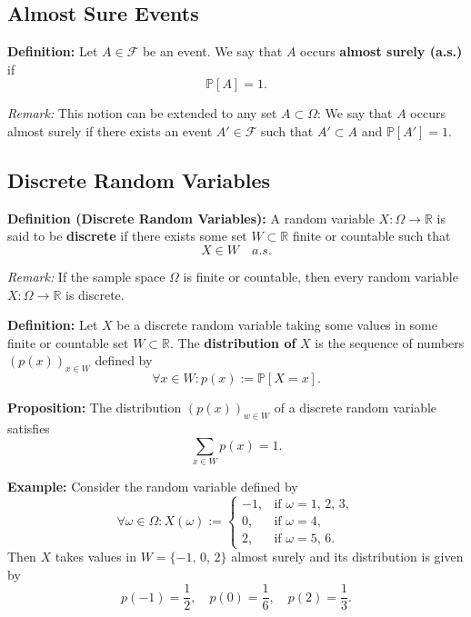 \documentclass[a4paper]{extarticle}
\begin{document}
\subsection{Almost Sure Events}

\textbf{Definition:} Let \(A \in \mathcal{F}\) be an event. We say that \(A\) occurs \textbf{almost surely (a.s.)} if
\[
    \mathbb{P}[A] = 1.
\]

\textit{Remark:} This notion can be extended to any set \(A \subset \Omega\): We say that \(A\) occurs almost surely if there exists an event \(A' \in \mathcal{F}\) such that \(A' \subset A\) and \(\mathbb{P}[A'] = 1\).

\subsection{Discrete Random Variables}

\textbf{Definition (Discrete Random Variables):} A random variable \(X : \Omega \to \mathbb{R}\) is said to be \textbf{discrete} if there exists some set \(W \subset \mathbb{R}\) finite or countable such that
\[
    X \in W \quad a.s.
\]

\textit{Remark:} If the sample space \(\Omega\) is finite or countable, then every random variable \(X : \Omega \to \mathbb{R}\) is discrete.

\textbf{Definition:} Let \(X\) be a discrete random variable taking some values in some finite or countable set \(W \subset \mathbb{R}\). The \textbf{distribution of} \(X\) is the sequence of numbers \((p(x))_{x \in W}\) defined by
\[
    \forall x \in W : p(x) := \mathbb{P}[X = x].
\]

\begin{cbox}
    \textbf{Proposition:} The distribution \((p(x))_{w \in W}\) of a discrete random variable satisfies
    \[
        \sum_{x \in W} p(x) = 1.
    \]
\end{cbox}

\begin{ebox}
    \textbf{Example:} Consider the random variable defined by
    \[
        \forall \omega \in \Omega : X(\omega) := \begin{cases}
            -1, &\text{if } \omega = 1, \, 2, \, 3,\\
            0, &\text{if } \omega = 4,\\
            2, &\text{if } \omega = 5, \, 6.
        \end{cases}
    \]
    Then \(X\) takes values in \(W = \{-1, \, 0, \, 2\}\) almost surely and its distribution is given by
    \[
        p(-1) = \frac{1}{2}, \quad p(0) = \frac{1}{6}, \quad p(2) = \frac{1}{3}.
    \]
\end{ebox}
\end{document}
